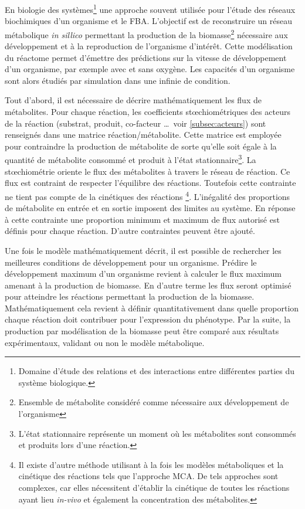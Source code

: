 \begin{refsegment}
    En biologie des systèmes\footnote{Domaine d'étude des relations et des interactions entre différentes parties du système biologique.} une approche souvent utilisée pour l'étude des réseaux biochimiques d'un organisme et le \gls{FBA}\cite{orth2010flux}. L'objectif est de reconstruire un réseau métabolique \textit{in sillico} permettant la production de la biomasse\footnote{Ensemble de métabolite considéré comme nécessaire aux développement de l'organisme} nécessaire aux développement et à la reproduction de l'organisme d'intérêt. Cette modélisation du réactome permet d'émettre des prédictions sur la vitesse de développement d'un organisme, par exemple avec et sans oxygène. Les capacités d'un organisme sont alors étudiés par simulation dans une infinie de condition.
    
    Tout d'abord, il est nécessaire de décrire mathématiquement les flux de métabolites. Pour chaque réaction, les coefficients stœchiométriques des acteurs de la réaction (substrat, produit, co-facteur \ldots~voir \cref{subsec:acteurs}) sont renseignés dans une matrice réaction/métabolite. Cette matrice est employée pour contraindre la production de métabolite de sorte qu'elle soit égale à la quantité de métabolite consommé et produit à l'état stationnaire\footnote{L'état stationnaire représente un moment où les métabolites sont consommés et produits lors d'une réaction.}.  La stœchiométrie oriente le flux des métabolites à travers le réseau de réaction. Ce flux est contraint de respecter l'équilibre des réactions. Toutefois cette contrainte ne tient pas compte de la cinétiques des réactions \cite{covert2001metabolic,edwards2002metabolic}\footnote{Il existe d'autre méthode utilisant à la fois les modèles métaboliques et la cinétique des réactions tels que l'approche \gls{MCA}. De tels approches sont complexes, car elles nécessitent d'établir la cinétique de toutes les réactions ayant lieu \textit{in-vivo} et également la concentration des métabolites.}. L'inégalité des proportions de métabolite en entrée et en sortie imposent des limites au système. En réponse à cette contrainte une proportion minimum et maximum de flux autorisé est définis pour chaque réaction. D'autre contraintes peuvent être ajouté.
    
    Une fois le modèle mathématiquement décrit, il est possible de rechercher les meilleures conditions de développement pour un organisme. Prédire le développement maximum d'un organisme revient à calculer le flux maximum amenant à la production de biomasse. En d'autre terme les flux seront optimisé pour atteindre les réactions permettant la production de la biomasse. Mathématiquement cela revient à définir quantitativement dans quelle proportion chaque réaction doit contribuer pour l'expression du phénotype.  Par la suite, la production par modélisation de la biomasse peut être comparé aux résultats expérimentaux, validant ou non le modèle métabolique.
    

\end{refsegment}
